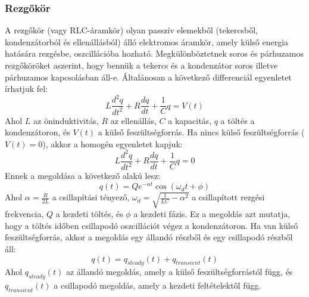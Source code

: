 \documentclass[a4paper,12pt]{article}
\begin{document}
\subsubsection{Rezgőkör}
A rezgőkör (vagy RLC-áramkör) olyan passzív elemekből (tekercsből, kondenzátorból és ellenállásból) álló elektromos áramkör, amely külső energia hatására rezgésbe, oszcillációba hozható.
Megkülönböztetnek soros és párhuzamos rezgőköröket aszerint, hogy bennük a tekercs és a kondenzátor soros illetve párhuzamos kapcsolásban áll-e. Általánosan a következő differenciál egyenletet írhatjuk fel:
\begin{equation}
    L \frac{d^2 q}{dt^2} + R \frac{dq}{dt} + \frac{1}{C} q = V(t)
\end{equation}
Ahol $L$ az öninduktivitás, $R$ az ellenállás, $C$ a kapacitás, $q$ a töltés a kondenzátoron, és $V(t)$ a külső feszültségforrás. Ha nincs külső feszültségforrás ($V(t) = 0$), akkor a homogén egyenletet kapjuk:
\begin{equation}
    L \frac{d^2 q}{dt^2} + R \frac{dq}{dt} + \frac{1}{C} q = 0
\end{equation}
Ennek a megoldása a következő alakú lesz:
\begin{equation}
    q(t) = Q e^{-\alpha t} \cos(\omega_d t + \phi)
\end{equation}
Ahol $\alpha = \frac{R}{2L}$ a csillapítási tényező, $\omega_d = \sqrt{\frac{1}{LC} - \alpha^2}$ a csillapított rezgési frekvencia, $Q$ a kezdeti töltés, és $\phi$ a kezdeti fázis. Ez a megoldás azt mutatja, hogy a töltés időben csillapodó oszcillációt végez a kondenzátoron.
Ha van külső feszültségforrás, akkor a megoldás egy állandó részből és egy csillapodó részből áll:
\begin{equation}
    q(t) = q_{steady}(t) + q_{transient}(t)
\end{equation}
Ahol $q_{steady}(t)$ az állandó megoldás, amely a külső feszültségforrástól függ, és $q_{transient}(t)$ a csillapodó megoldás, amely a kezdeti feltételektől függ.
\end{document}
